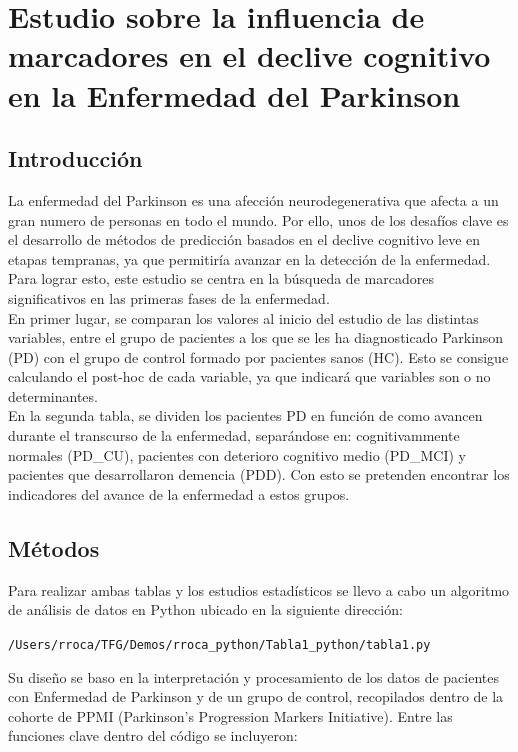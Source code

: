 \documentclass[12pt]{article}
\begin{document}
\section{Estudio sobre la influencia de marcadores en el declive cognitivo en la Enfermedad del Parkinson}

\subsection{Introducción}
La enfermedad del Parkinson es una afección neurodegenerativa que afecta a un gran numero de personas en todo el mundo. Por ello, unos de los desafíos clave es el desarrollo de métodos de predicción basados en el declive cognitivo leve en etapas tempranas, ya que permitiría avanzar en la detección de la enfermedad. Para lograr esto, este estudio se centra en la búsqueda de marcadores significativos en las primeras fases de la enfermedad.\\

En primer lugar, se comparan los valores al inicio del estudio de las distintas variables, entre el grupo de pacientes a los que se les ha diagnosticado Parkinson (PD) con el grupo de control formado por pacientes sanos (HC). Esto se consigue calculando el post-hoc de cada variable, ya que indicará que variables son o no determinantes.\\

En la segunda tabla, se dividen los pacientes PD en función de como avancen durante el transcurso de la enfermedad, separándose en: cognitivammente normales (PD\_CU), pacientes con deterioro cognitivo medio (PD\_MCI) y pacientes que desarrollaron demencia (PDD). Con esto se pretenden encontrar los indicadores del avance de la enfermedad a estos grupos.


\subsection{Métodos}
Para realizar ambas tablas y los estudios estadísticos se llevo a cabo un algoritmo de análisis de datos en Python ubicado en la siguiente dirección:
\begin{center}
	\texttt{/Users/rroca/TFG/Demos/rroca\_python/Tabla1\_python/tabla1.py}
\end{center} 
Su diseño se baso en la interpretación y procesamiento de los datos de pacientes con Enfermedad de Parkinson y de un grupo de control,  recopilados dentro de la cohorte de PPMI (Parkinson's Progression Markers Initiative). Entre las funciones clave dentro del código se incluyeron:
\end{document}
